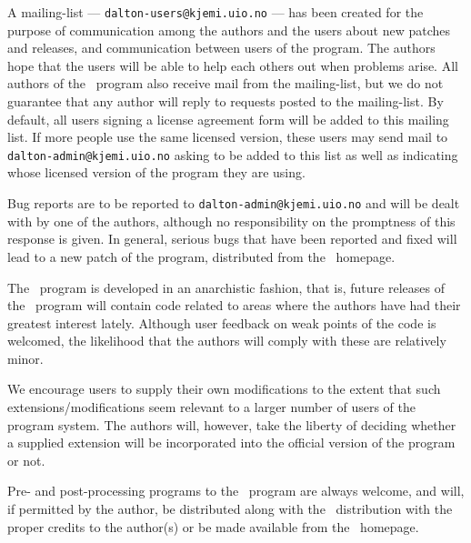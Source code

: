 A mailing-list ---
\verb|dalton-users@kjemi.uio.no| --- has been created for
the purpose of communication among the authors and the users about
new patches and releases, and communication between users of the
program. The authors hope that the
users will be able to help each others out when problems
arise. All authors of the \dalton\ program also receive mail from the
mailing-list, but we do not guarantee that any author will reply to
requests posted to the mailing-list. By default, all users signing a
license agreement form will be added to this mailing list. If more
people use the same licensed version, these users may send mail to
\verb|dalton-admin@kjemi.uio.no| asking to be added to this list as
well as indicating whose licensed version of the program they are using.

Bug reports are to be reported to \verb|dalton-admin@kjemi.uio.no| and
will be dealt with by one of the authors, although no responsibility
on the promptness of this response is given. In general, serious bugs
that have been
reported and fixed will lead to a new patch of the program, distributed from the
\dalton\ homepage.

The \dalton\ program is developed in an anarchistic fashion, that is,
future releases of the \dalton\ program will contain code related to
areas where the authors have had their greatest interest
lately. Although user feedback on weak points of the code is welcomed, the
likelihood that the authors will comply with these are relatively
minor.

We encourage users to supply their own
modifications to the extent that
such extensions/modifications seem relevant to a larger number of
users of the program system. The authors will, however, take the
liberty of deciding whether a supplied extension will be incorporated
into the official version of the program or not.

Pre- and post-processing programs to the \dalton\ program are always
welcome, and will, if permitted by the author, be distributed along
with the \dalton\ distribution with the proper credits to the
author(s) or be made available from the \dalton\ homepage.

